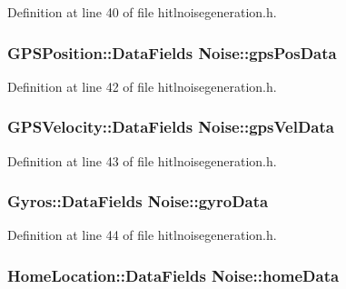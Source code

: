 Definition at line 40 of file hitlnoisegeneration.\-h.

\hypertarget{group__hitlplugin_ga9ec5e3f5256aa25ca8a8556643eb355d}{
\subsubsection[{gps\-Pos\-Data}]{\setlength{\rightskip}{0pt plus 5cm}G\-P\-S\-Position\-::\-Data\-Fields Noise\-::gps\-Pos\-Data}}\label{group__hitlplugin_ga9ec5e3f5256aa25ca8a8556643eb355d}


Definition at line 42 of file hitlnoisegeneration.\-h.

\hypertarget{group__hitlplugin_gafefa36e4fa6d8da826bbfcf9f604119c}{
\subsubsection[{gps\-Vel\-Data}]{\setlength{\rightskip}{0pt plus 5cm}G\-P\-S\-Velocity\-::\-Data\-Fields Noise\-::gps\-Vel\-Data}}\label{group__hitlplugin_gafefa36e4fa6d8da826bbfcf9f604119c}


Definition at line 43 of file hitlnoisegeneration.\-h.

\hypertarget{group__hitlplugin_gaf3fae05e7092b987f81f25ff7709ffb9}{
\subsubsection[{gyro\-Data}]{\setlength{\rightskip}{0pt plus 5cm}Gyros\-::\-Data\-Fields Noise\-::gyro\-Data}}\label{group__hitlplugin_gaf3fae05e7092b987f81f25ff7709ffb9}


Definition at line 44 of file hitlnoisegeneration.\-h.

\hypertarget{group__hitlplugin_ga3138fe65ade5af4ff6ff614c0956fc0a}{
\subsubsection[{home\-Data}]{\setlength{\rightskip}{0pt plus 5cm}Home\-Location\-::\-Data\-Fields Noise\-::home\-Data}}\label{group__hitlplugin_ga3138fe65ade5af4ff6ff614c0956fc0a}


